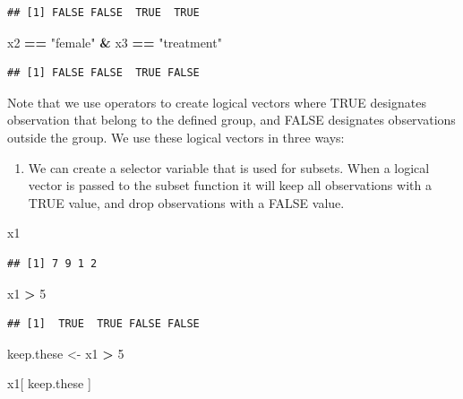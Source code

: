\documentclass[]{book}
\newenvironment{Shaded}{\begin{snugshade}}{\end{snugshade}}
\newcommand{\DecValTok}[1]{\textcolor[rgb]{0.00,0.00,0.81}{#1}}
\newcommand{\NormalTok}[1]{#1}
\newcommand{\OperatorTok}[1]{\textcolor[rgb]{0.81,0.36,0.00}{\textbf{#1}}}
\newcommand{\StringTok}[1]{\textcolor[rgb]{0.31,0.60,0.02}{#1}}
\providecommand{\tightlist}{%
  \setlength{\itemsep}{0pt}\setlength{\parskip}{0pt}}
\theoremstyle{definition}
\theoremstyle{definition}
\theoremstyle{definition}
\theoremstyle{remark}
\begin{document}
\begin{verbatim}
## [1] FALSE FALSE  TRUE  TRUE
\end{verbatim}

\begin{Shaded}
\begin{Highlighting}[]
\NormalTok{x2 }\OperatorTok{==}\StringTok{ "female"} \OperatorTok{&}\StringTok{ }\NormalTok{x3 }\OperatorTok{==}\StringTok{ "treatment"}
\end{Highlighting}
\end{Shaded}

\begin{verbatim}
## [1] FALSE FALSE  TRUE FALSE
\end{verbatim}

Note that we use operators to create logical vectors where TRUE
designates observation that belong to the defined group, and FALSE
designates observations outside the group. We use these logical vectors
in three ways:

\begin{enumerate}
\def\labelenumi{(\arabic{enumi})}
\tightlist
\item
  We can create a selector variable that is used for subsets. When a
  logical vector is passed to the subset function it will keep all
  observations with a TRUE value, and drop observations with a FALSE
  value.
\end{enumerate}

\begin{Shaded}
\begin{Highlighting}[]
\NormalTok{x1}
\end{Highlighting}
\end{Shaded}

\begin{verbatim}
## [1] 7 9 1 2
\end{verbatim}

\begin{Shaded}
\begin{Highlighting}[]
\NormalTok{x1 }\OperatorTok{>}\StringTok{ }\DecValTok{5}
\end{Highlighting}
\end{Shaded}

\begin{verbatim}
## [1]  TRUE  TRUE FALSE FALSE
\end{verbatim}

\begin{Shaded}
\begin{Highlighting}[]
\NormalTok{keep.these <-}\StringTok{ }\NormalTok{x1 }\OperatorTok{>}\StringTok{ }\DecValTok{5}

\NormalTok{x1[ keep.these ]}
\end{Highlighting}
\end{Shaded}
\end{document}
